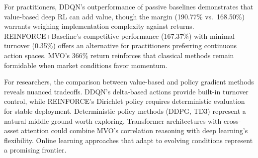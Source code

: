 For practitioners, DDQN's outperformance of passive baselines demonstrates that value-based deep RL can add value, though the margin (190.77\% vs.\ 168.50\%) warrants weighing implementation complexity against returns. REINFORCE+Baseline's competitive performance (167.37\%) with minimal turnover (0.35\%) offers an alternative for practitioners preferring continuous action spaces. MVO's 366\% return reinforces that classical methods remain formidable when market conditions favor momentum.

For researchers, the comparison between value-based and policy gradient methods reveals nuanced tradeoffs. DDQN's delta-based actions provide built-in turnover control, while REINFORCE's Dirichlet policy requires deterministic evaluation for stable deployment. Deterministic policy methods (DDPG, TD3) represent a natural middle ground worth exploring. Transformer architectures with cross-asset attention could combine MVO's correlation reasoning with deep learning's flexibility. Online learning approaches that adapt to evolving conditions represent a promising frontier.
